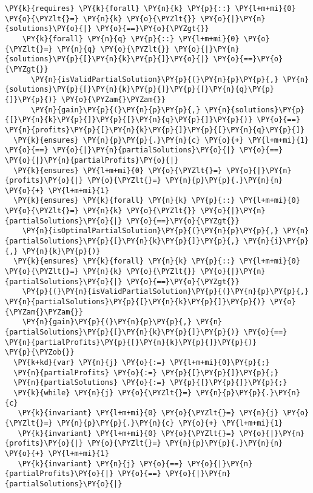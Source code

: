 \begin{sloppypar}
\begin{Verbatim}[commandchars=\\\{\}]
  \PY{k}{requires} \PY{k}{forall} \PY{n}{k} \PY{p}{::} \PY{l+m+mi}{0} \PY{o}{\PYZlt{}=} \PY{n}{k} \PY{o}{\PYZlt{}} \PY{o}{|}\PY{n}{solutions}\PY{o}{|} \PY{o}{==}\PY{o}{\PYZgt{}} 
    \PY{k}{forall} \PY{n}{q} \PY{p}{::} \PY{l+m+mi}{0} \PY{o}{\PYZlt{}=} \PY{n}{q} \PY{o}{\PYZlt{}} \PY{o}{|}\PY{n}{solutions}\PY{p}{[}\PY{n}{k}\PY{p}{]}\PY{o}{|} \PY{o}{==}\PY{o}{\PYZgt{}} 
      \PY{n}{isValidPartialSolution}\PY{p}{(}\PY{n}{p}\PY{p}{,} \PY{n}{solutions}\PY{p}{[}\PY{n}{k}\PY{p}{]}\PY{p}{[}\PY{n}{q}\PY{p}{]}\PY{p}{)} \PY{o}{\PYZam{}\PYZam{}} 
      \PY{n}{gain}\PY{p}{(}\PY{n}{p}\PY{p}{,} \PY{n}{solutions}\PY{p}{[}\PY{n}{k}\PY{p}{]}\PY{p}{[}\PY{n}{q}\PY{p}{]}\PY{p}{)} \PY{o}{==} \PY{n}{profits}\PY{p}{[}\PY{n}{k}\PY{p}{]}\PY{p}{[}\PY{n}{q}\PY{p}{]}
  \PY{k}{ensures} \PY{n}{p}\PY{p}{.}\PY{n}{c} \PY{o}{+} \PY{l+m+mi}{1} \PY{o}{==} \PY{o}{|}\PY{n}{partialSolutions}\PY{o}{|} \PY{o}{==} \PY{o}{|}\PY{n}{partialProfits}\PY{o}{|}
  \PY{k}{ensures} \PY{l+m+mi}{0} \PY{o}{\PYZlt{}=} \PY{o}{|}\PY{n}{profits}\PY{o}{|} \PY{o}{\PYZlt{}=} \PY{n}{p}\PY{p}{.}\PY{n}{n} \PY{o}{+} \PY{l+m+mi}{1} 
  \PY{k}{ensures} \PY{k}{forall} \PY{n}{k} \PY{p}{::} \PY{l+m+mi}{0} \PY{o}{\PYZlt{}=} \PY{n}{k} \PY{o}{\PYZlt{}} \PY{o}{|}\PY{n}{partialSolutions}\PY{o}{|} \PY{o}{==}\PY{o}{\PYZgt{}} 
    \PY{n}{isOptimalPartialSolution}\PY{p}{(}\PY{n}{p}\PY{p}{,} \PY{n}{partialSolutions}\PY{p}{[}\PY{n}{k}\PY{p}{]}\PY{p}{,} \PY{n}{i}\PY{p}{,} \PY{n}{k}\PY{p}{)}
  \PY{k}{ensures} \PY{k}{forall} \PY{n}{k} \PY{p}{::} \PY{l+m+mi}{0} \PY{o}{\PYZlt{}=} \PY{n}{k} \PY{o}{\PYZlt{}} \PY{o}{|}\PY{n}{partialSolutions}\PY{o}{|} \PY{o}{==}\PY{o}{\PYZgt{}} 
    \PY{p}{(}\PY{n}{isValidPartialSolution}\PY{p}{(}\PY{n}{p}\PY{p}{,} \PY{n}{partialSolutions}\PY{p}{[}\PY{n}{k}\PY{p}{]}\PY{p}{)} \PY{o}{\PYZam{}\PYZam{}} 
    \PY{n}{gain}\PY{p}{(}\PY{n}{p}\PY{p}{,} \PY{n}{partialSolutions}\PY{p}{[}\PY{n}{k}\PY{p}{]}\PY{p}{)} \PY{o}{==} \PY{n}{partialProfits}\PY{p}{[}\PY{n}{k}\PY{p}{]}\PY{p}{)}
\PY{p}{\PYZob{}}
  \PY{k+kd}{var} \PY{n}{j} \PY{o}{:=} \PY{l+m+mi}{0}\PY{p}{;}
  \PY{n}{partialProfits} \PY{o}{:=} \PY{p}{[}\PY{p}{]}\PY{p}{;}
  \PY{n}{partialSolutions} \PY{o}{:=} \PY{p}{[}\PY{p}{]}\PY{p}{;}
  \PY{k}{while} \PY{n}{j} \PY{o}{\PYZlt{}=} \PY{n}{p}\PY{p}{.}\PY{n}{c}
   \PY{k}{invariant} \PY{l+m+mi}{0} \PY{o}{\PYZlt{}=} \PY{n}{j} \PY{o}{\PYZlt{}=} \PY{n}{p}\PY{p}{.}\PY{n}{c} \PY{o}{+} \PY{l+m+mi}{1}
   \PY{k}{invariant} \PY{l+m+mi}{0} \PY{o}{\PYZlt{}=} \PY{o}{|}\PY{n}{profits}\PY{o}{|} \PY{o}{\PYZlt{}=} \PY{n}{p}\PY{p}{.}\PY{n}{n} \PY{o}{+} \PY{l+m+mi}{1}
   \PY{k}{invariant} \PY{n}{j} \PY{o}{==} \PY{o}{|}\PY{n}{partialProfits}\PY{o}{|} \PY{o}{==} \PY{o}{|}\PY{n}{partialSolutions}\PY{o}{|}

\end{Verbatim}
\end{sloppypar}
